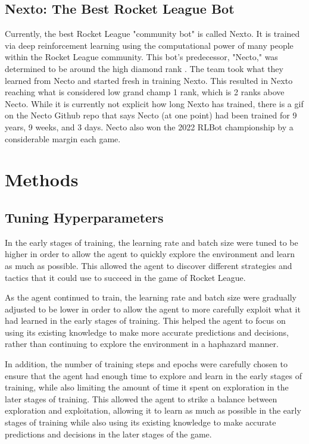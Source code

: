 \documentclass[10pt,twocolumn]{article}
\begin{document}
\subsection{Nexto: The Best Rocket League Bot}
 Currently, the best Rocket League "community bot" is called Nexto. It is trained via deep reinforcement 
 learning using the computational power of many people within the Rocket League community. This bot's 
 predecessor, "Necto," was determined to be around the high diamond rank \cite{github}. The team took what 
 they learned from Necto and started fresh in training Nexto. This resulted in Nexto reaching what is 
 considered low grand champ 1 rank, which is 2 ranks above Necto. While it is currently not explicit how 
 long Nexto has trained, there is a gif on the Necto Github repo that says Necto (at one point) had been 
 trained for 9 years, 9 weeks, and 3 days. Necto also won the 2022 RLBot championship by a considerable 
 margin each game.

\section{Methods}

\subsection{Tuning Hyperparameters}
In the early stages of training, the learning rate and batch 
size were tuned to be higher in order to allow the agent to 
quickly explore the environment and learn as much as 
possible. This allowed the agent to discover different 
strategies and tactics that it could use to succeed in the 
game of Rocket League.

As the agent continued to train, the learning rate and batch 
size were gradually adjusted to be lower in order to allow 
the agent to more carefully exploit what it had learned in 
the early stages of training. This helped the agent to focus 
on using its existing knowledge to make more accurate 
predictions and decisions, rather than continuing to explore 
the environment in a haphazard manner.

In addition, the number of training steps and epochs were 
carefully chosen to ensure that the agent had enough time to 
explore and learn in the early stages of training, while also 
limiting the amount of time it spent on exploration in the 
later stages of training. This allowed the agent to strike a 
balance between exploration and exploitation, allowing it to 
learn as much as possible in the early stages of training 
while also using its existing knowledge to make accurate 
predictions and decisions in the later stages of the game.
\end{document}
